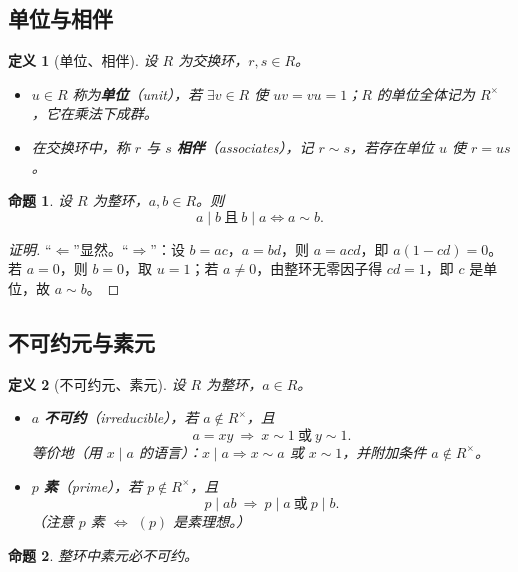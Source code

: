 \documentclass[11pt,a4paper]{ctexart}
\newtheorem*{definition}{定义}
\newtheorem*{proposition}{命题}
\theoremstyle{remark}
\begin{document}
\subsection*{单位与相伴}

\begin{definition}[单位、相伴]
设 $R$ 为交换环，$r,s\in R$。
\begin{itemize}
    \item $u\in R$ 称为\textbf{单位}（unit），若 $\exists v\in R$ 使 $uv=vu=1$；$R$ 的单位全体记为 $R^{\times}$，它在乘法下成群。
    \item 在交换环中，称 $r$ 与 $s$ \textbf{相伴}（associates），记 $r\sim s$，若存在单位 $u$ 使 $r=us$。
\end{itemize}
\end{definition}

\begin{proposition}
设 $R$ 为整环，$a,b\in R$。则
\[
a\mid b\ \text{且}\ b\mid a \iff a\sim b .
\]
\end{proposition}

\begin{proof}[证明]
“$\Leftarrow$”显然。“$\Rightarrow$”：设 $b=ac$，$a=bd$，则 $a=acd$，即 $a(1-cd)=0$。若 $a=0$，则 $b=0$，取 $u=1$；若 $a\neq 0$，由整环无零因子得 $cd=1$，即 $c$ 是单位，故 $a\sim b$。
\end{proof}

\subsection*{不可约元与素元}

\begin{definition}[不可约元、素元]
设 $R$ 为整环，$a\in R$。
\begin{itemize}
    \item $a$ \textbf{不可约}（irreducible），若 $a\notin R^{\times}$，且
    \[
    a=xy\ \Longrightarrow\ x\sim 1\ \text{或}\ y\sim 1 .
    \]
    等价地（用 $x\mid a$ 的语言）：$x\mid a\Rightarrow x\sim a$ 或 $x\sim 1$，并附加条件 $a\notin R^{\times}$。
    \item $p$ \textbf{素}（prime），若 $p\notin R^{\times}$，且
    \[
    p\mid ab\ \Longrightarrow\ p\mid a\ \text{或}\ p\mid b .
    \]
    （注意 $p$ 素 $\iff$ $(p)$ 是素理想。）
\end{itemize}
\end{definition}

\begin{proposition}
整环中素元必不可约。
\end{proposition}
\end{document}
